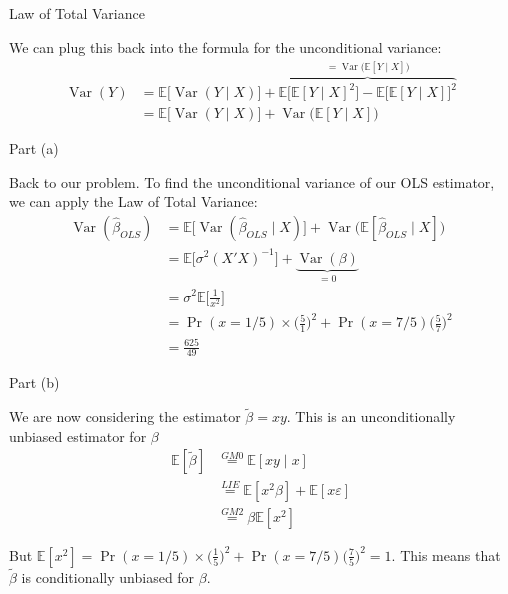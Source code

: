 \begin{frame}{Law of Total Variance}

    We can plug this back into the formula for the unconditional variance:
    \begin{align*}
        \operatorname{Var}(Y) &= \mathbb{E} \Biggr[ \operatorname{Var}(Y \mid X) \Biggr] + \overbrace{\mathbb{E} \Biggr[ \mathbb{E}[Y \mid X ]^2 \Biggr] - \mathbb{E} \Biggr[ \mathbb{E}[Y \mid X] \Biggr]^2}^{= \operatorname{Var}\Biggr( \mathbb{E} [Y\mid X] \Biggr)}
        \\
        &= \mathbb{E} \Biggr[ \operatorname{Var}(Y \mid X) \Biggr] +  \operatorname{Var}\Biggr( \mathbb{E} [Y\mid X] \Biggr)
    \end{align*}
    
\end{frame}

\begin{frame}{Part (a)}

    Back to our problem. To find the unconditional variance of our OLS estimator, we can apply the Law of Total Variance:
    \begin{align*}
        \operatorname{Var}(\hat{\beta}_{OLS}) &= \mathbb{E} \Biggr[ \operatorname{Var}(\hat{\beta}_{OLS} \mid X) \Biggr] +  \operatorname{Var}\Biggr( \mathbb{E} [\hat{\beta}_{OLS} \mid X] \Biggr)
        \\
        &= \mathbb{E} \Biggr[ \sigma^2 (X'X)^{-1} \Biggr] +  \underbrace{\operatorname{Var} ( \beta )}_{=0}
        \\
        &= \sigma^2 \mathbb{E}\Biggr[ \frac{1}{x^2} \Biggr]
        \\
        &= \operatorname{Pr}(x = 1/5) \times \Biggr( \frac{5}{1} \Biggr)^2 + \operatorname{Pr}(x = 7/5) \Biggr( \frac{5}{7} \Biggr)^2
        \\
        &= \frac{625}{49}
    \end{align*}
    
\end{frame}

\begin{frame}{Part (b)}

    We are now considering the estimator $\tilde{\beta} = xy$. This is an unconditionally unbiased estimator for $\beta$
    \begin{align*}
        \mathbb{E} [\tilde{\beta}] &\overset{GM0}{=} \mathbb{E} [ x y \mid x]
        \\
        &\overset{LIE}{=} \mathbb{E} [ x^2 \beta ] + \mathbb{E} [ x \varepsilon ]
        \\
        &\overset{GM2}{=} \beta \mathbb{E}[x^2]
    \end{align*}

    But $\mathbb{E}[x^2] = \operatorname{Pr}(x = 1/5) \times \Biggr( \frac{1}{5} \Biggr)^2 + \operatorname{Pr}(x = 7/5) \Biggr( \frac{7}{5} \Biggr)^2 = 1$. This means that $\tilde{\beta}$ is conditionally unbiased for $\beta$.
    
\end{frame}

